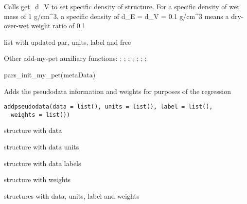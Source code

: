 \documentclass[a4paper]{book}
\begin{document}
%
\begin{Details}\relax
Calls get\_d\_V to set specific density of structure. For a specific density of wet mass of 1 g/cm\textasciicircum{}3,
a specific density of d\_E = d\_V = 0.1 g/cm\textasciicircum{}3 means a dry-over-wet weight ratio of 0.1
\end{Details}
%
\begin{Value}
list with updated par, units, label and free
\end{Value}
%
\begin{SeeAlso}\relax
Other add-my-pet auxiliary functions: ;
; ;
; ;
;
; 
\end{SeeAlso}
%
\begin{Examples}
\begin{ExampleCode}
pars_init_my_pet(metaData)
\end{ExampleCode}
\end{Examples}
%
\begin{Description}\relax
Adds the pseudodata information and weights for purposes of the regression
\end{Description}
%
\begin{Usage}
\begin{verbatim}
addpseudodata(data = list(), units = list(), label = list(),
  weights = list())
\end{verbatim}
\end{Usage}
%
\begin{Arguments}
\begin{ldescription}
\item[\code{data}] structure with data

\item[\code{units}] structure with data units

\item[\code{label}] structure with data labels

\item[\code{weights}] structure with weights
\end{ldescription}
\end{Arguments}
%
\begin{Value}
structures with data, units, label and weights
\end{Value}
\end{document}
